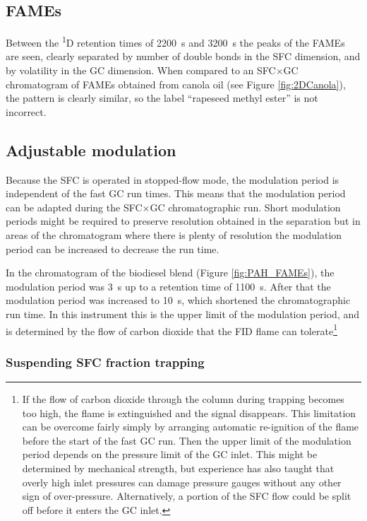 \subsection{FAMEs}

Between the \textsuperscript{1}D retention times of \SI{2200}{\second} and
\SI{3200}{\second} the peaks of the FAMEs are seen, clearly separated by number
of double bonds in the SFC dimension, and by volatility in the GC dimension.
When compared to an SFC×GC chromatogram of FAMEs obtained from canola oil (see
Figure \ref{fig:2DCanola}), the pattern is clearly similar, so the label
``rapeseed methyl ester'' is not incorrect.

\subsection{Adjustable modulation}

Because the SFC is operated in stopped-flow mode, the modulation period is
independent of the fast GC run times. This means that the modulation period can
be adapted during the SFC×GC chromatographic run. Short modulation periods might
be required to preserve resolution obtained in the \oneD separation but in areas
of the chromatogram where there is plenty of resolution the modulation period
can be increased to decrease the run time.

In the chromatogram of the biodiesel blend (Figure \ref{fig:PAH_FAMEs}), the
modulation period was \SI{3}{\second} up to a \oneD retention time of
\SI{1100}{s}. After that the modulation period was increased to
\SI{10}{\second}, which shortened the chromatographic run time. In this
instrument this is the upper limit of the modulation period, and is determined
by the flow of carbon dioxide that the FID flame can tolerate\footnote{If the
flow of carbon dioxide through the column during trapping becomes too high, the
flame is extinguished and the signal disappears. This limitation can be overcome
fairly simply by arranging automatic re-ignition of the flame before the start
of the fast GC run. Then the upper limit of the modulation period depends on the
pressure limit of the GC inlet. This might be determined by mechanical strength,
but experience has also taught that overly high inlet pressures can damage
pressure gauges without any other sign of over-pressure. Alternatively, a
portion of the SFC flow could be split off before it enters the GC inlet.}

\subsubsection{Suspending SFC fraction trapping}

